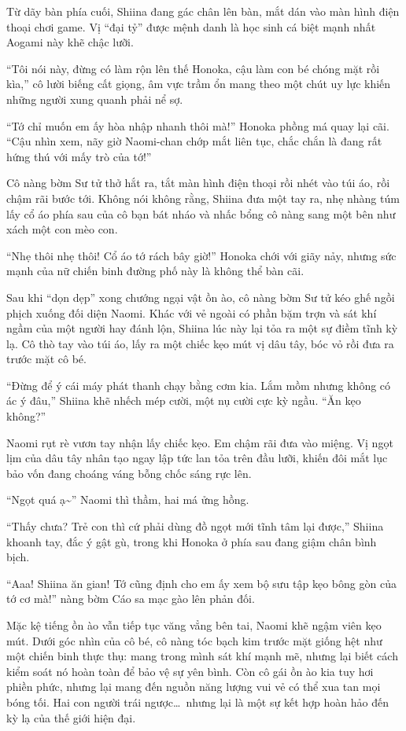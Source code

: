 \documentclass[../main.tex]{subfiles}
\begin{document}
Từ dãy bàn phía cuối, Shiina đang gác chân lên bàn, mắt dán vào màn hình điện thoại chơi game. Vị ``đại tỷ'' được mệnh danh là học sinh cá biệt mạnh nhất Aogami này khẽ chậc lưỡi.

``Tôi nói này, đừng có làm rộn lên thế Honoka, cậu làm con bé chóng mặt rồi kìa,'' cô lười biếng cất giọng, âm vực trầm ổn mang theo một chút uy lực khiến những người xung quanh phải nể sợ.

``Tớ chỉ muốn em ấy hòa nhập nhanh thôi mà!'' Honoka phồng má quay lại cãi. ``Cậu nhìn xem, nãy giờ Naomi-chan chớp mắt liên tục, chắc chắn là đang rất hứng thú với mấy trò của tớ!''

Cô nàng bờm Sư tử thở hắt ra, tắt màn hình điện thoại rồi nhét vào túi áo, rồi chậm rãi bước tới. Không nói không rằng, Shiina đưa một tay ra, nhẹ nhàng túm lấy cổ áo phía sau của cô bạn bát nháo và nhấc bổng cô nàng sang một bên như xách một con mèo con.

``Nhẹ thôi nhẹ thôi! Cổ áo tớ rách bây giờ!'' Honoka chới với giãy nảy, nhưng sức mạnh của nữ chiến binh đường phố này là không thể bàn cãi.

Sau khi ``dọn dẹp'' xong chướng ngại vật ồn ào, cô nàng bờm Sư tử kéo ghế ngồi phịch xuống đối diện Naomi. Khác với vẻ ngoài có phần bặm trợn và sát khí ngầm của một người hay đánh lộn, Shiina lúc này lại tỏa ra một sự điềm tĩnh kỳ lạ. Cô thò tay vào túi áo, lấy ra một chiếc kẹo mút vị dâu tây, bóc vỏ rồi đưa ra trước mặt cô bé.

``Đừng để ý cái máy phát thanh chạy bằng cơm kia. Lắm mồm nhưng không có ác ý đâu,'' Shiina khẽ nhếch mép cười, một nụ cười cực kỳ ngầu. ``Ăn kẹo không?''

Naomi rụt rè vươn tay nhận lấy chiếc kẹo. Em chậm rãi đưa vào miệng. Vị ngọt lịm của dâu tây nhân tạo ngay lập tức lan tỏa trên đầu lưỡi, khiến đôi mắt lục bảo vốn đang choáng váng bỗng chốc sáng rực lên.

``Ngọt quá ạ\~{}'' Naomi thì thầm, hai má ửng hồng.

``Thấy chưa? Trẻ con thì cứ phải dùng đồ ngọt mới tĩnh tâm lại được,'' Shiina khoanh tay, đắc ý gật gù, trong khi Honoka ở phía sau đang giậm chân bình bịch.

``Aaa! Shiina ăn gian! Tớ cũng định cho em ấy xem bộ sưu tập kẹo bông gòn của tớ cơ mà!'' nàng bờm Cáo sa mạc gào lên phản đối.

Mặc kệ tiếng ồn ào vẫn tiếp tục văng vẳng bên tai, Naomi khẽ ngậm viên kẹo mút. Dưới góc nhìn của cô bé, cô nàng tóc bạch kim trước mặt giống hệt như một chiến binh thực thụ: mang trong mình sát khí mạnh mẽ, nhưng lại biết cách kiểm soát nó hoàn toàn để bảo vệ sự yên bình. Còn cô gái ồn ào kia tuy hơi phiền phức, nhưng lại mang đến nguồn năng lượng vui vẻ có thể xua tan mọi bóng tối. Hai con người trái ngược\dots\ nhưng lại là một sự kết hợp hoàn hảo đến kỳ lạ của thế giới hiện đại.
\end{document}
